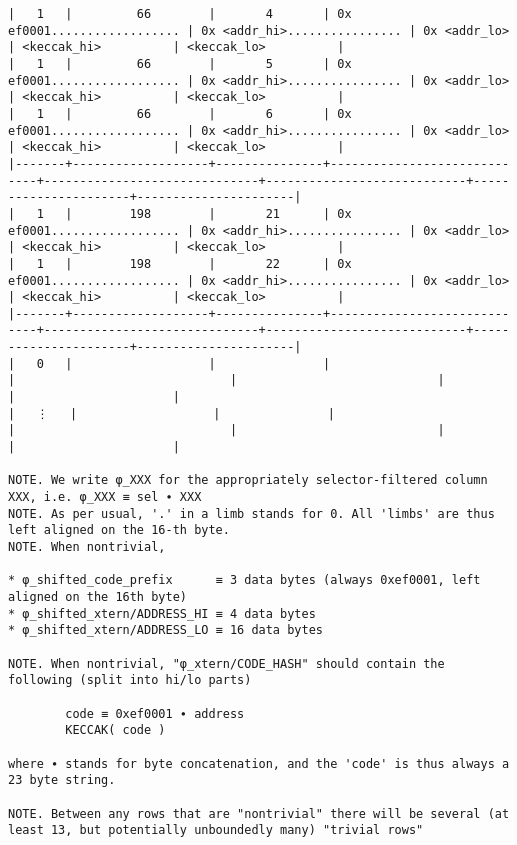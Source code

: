 \documentclass[varwidth=\maxdimen,margin=0.5cm,multi={verbatim}]{standalone}
\begin{document}
\begin{verbatim}
|   1   |         66        |       4       | 0x ef0001.................. | 0x <addr_hi>................ | 0x <addr_lo>               | <keccak_hi>          | <keccak_lo>          |
|   1   |         66        |       5       | 0x ef0001.................. | 0x <addr_hi>................ | 0x <addr_lo>               | <keccak_hi>          | <keccak_lo>          |
|   1   |         66        |       6       | 0x ef0001.................. | 0x <addr_hi>................ | 0x <addr_lo>               | <keccak_hi>          | <keccak_lo>          |
|-------+-------------------+---------------+-----------------------------+------------------------------+----------------------------+----------------------+----------------------|
|   1   |        198        |       21      | 0x ef0001.................. | 0x <addr_hi>................ | 0x <addr_lo>               | <keccak_hi>          | <keccak_lo>          |
|   1   |        198        |       22      | 0x ef0001.................. | 0x <addr_hi>................ | 0x <addr_lo>               | <keccak_hi>          | <keccak_lo>          |
|-------+-------------------+---------------+-----------------------------+------------------------------+----------------------------+----------------------+----------------------|
|   0   |                   |               |                             |                              |                            |                      |                      |
|   ⋮   |                   |               |                             |                              |                            |                      |                      |

NOTE. We write φ_XXX for the appropriately selector-filtered column XXX, i.e. φ_XXX ≡ sel ∙ XXX
NOTE. As per usual, '.' in a limb stands for 0. All 'limbs' are thus left aligned on the 16-th byte.
NOTE. When nontrivial,

* φ_shifted_code_prefix      ≡ 3 data bytes (always 0xef0001, left aligned on the 16th byte)
* φ_shifted_xtern/ADDRESS_HI ≡ 4 data bytes
* φ_shifted_xtern/ADDRESS_LO ≡ 16 data bytes

NOTE. When nontrivial, "φ_xtern/CODE_HASH" should contain the following (split into hi/lo parts)

        code ≡ 0xef0001 ∙ address
        KECCAK( code )

where ∙ stands for byte concatenation, and the 'code' is thus always a 23 byte string.

NOTE. Between any rows that are "nontrivial" there will be several (at least 13, but potentially unboundedly many) "trivial rows"


\end{verbatim}
\end{document}
